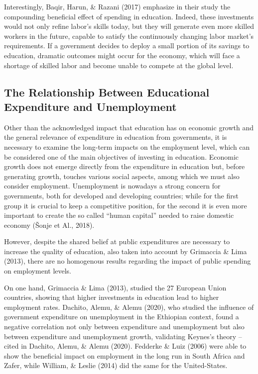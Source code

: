\documentclass[
]{article}
\begin{document}
Interestingly, Baqir, Harun, \& Razani (2017) emphasize in their study
the compounding beneficial effect of spending in education. Indeed,
these investments would not only refine labor's skills today, but they
will generate even more skilled workers in the future, capable to
satisfy the continuously changing labor market's requirements. If a
government decides to deploy a small portion of its savings to
education, dramatic outcomes might occur for the economy, which will
face a shortage of skilled labor and become unable to compete at the
global level.

\hypertarget{the-relationship-between-educational-expenditure-and-unemployment}{%
\subsection{The Relationship Between Educational Expenditure and
Unemployment}\label{the-relationship-between-educational-expenditure-and-unemployment}}

Other than the acknowledged impact that education has on economic growth
and the general relevance of expenditure in education from governments,
it is necessary to examine the long-term impacts on the employment
level, which can be considered one of the main objectives of investing
in education. Economic growth does not emerge directly from the
expenditure in education but, before generating growth, touches various
social aspects, among which we must also consider employment.
Unemployment is nowadays a strong concern for governments, both for
developed and developing countries; while for the first group it is
crucial to keep a competitive position, for the second it is even more
important to create the so called ``human capital'' needed to raise
domestic economy (Šonje et Al., 2018).

However, despite the shared belief at public expenditures are necessary
to increase the quality of education, also taken into account by
Grimaccia \& Lima (2013), there are no homogenous results regarding the
impact of public spending on employment levels.

On one hand, Grimaccia \& Lima (2013), studied the 27 European Union
countries, showing that higher investments in education lead to higher
employment rates. Dachito, Alemu, \& Alemu (2020), who studied the
influence of government expenditure on unemployment in the Ethiopian
context, found a negative correlation not only between expenditure and
unemployment but also between expenditure and unemployment growth,
validating Keynes's theory -- cited in Dachito, Alemu, \& Alemu (2020).
Fedderke \& Luiz (2006) were able to show the beneficial impact on
employment in the long run in South Africa and Zafer, while William, \&
Leslie (2014) did the same for the United-States.
\end{document}
